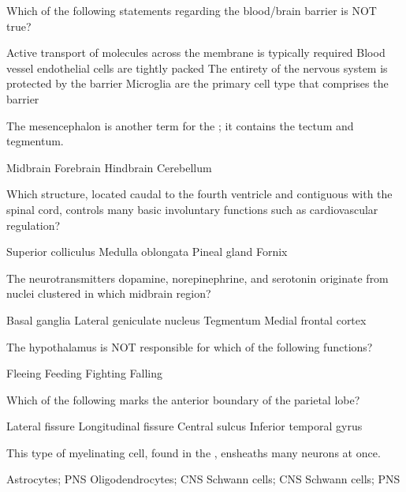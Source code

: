 \documentclass[answers]{exam}
\begin{document}
\begin{questions}
\question Which of the following statements regarding the blood/brain barrier is NOT true?
\begin{choices}
\choice Active transport of molecules across the membrane is typically required 
\choice Blood vessel endothelial cells are tightly packed
\choice The entirety of the nervous system is protected by the barrier 
\correctchoice Microglia are the primary cell type that comprises the barrier
\end{choices}

\question The mesencephalon is another term for the \fillin; it contains the tectum and tegmentum. 
\begin{choices}
\correctchoice Midbrain 
\choice Forebrain
\choice Hindbrain
\choice Cerebellum 
\end{choices}

\question Which structure, located caudal to the fourth ventricle and contiguous with the spinal cord, controls many basic involuntary functions such as cardiovascular regulation?
\begin{choices}
\choice Superior colliculus 
\correctchoice Medulla oblongata 
\choice Pineal gland
\choice Fornix 
\end{choices}

\question The neurotransmitters dopamine, norepinephrine, and serotonin originate from nuclei clustered in which midbrain region? 
\begin{choices}
\choice Basal ganglia
\choice Lateral geniculate nucleus 
\correctchoice Tegmentum 
\choice Medial frontal cortex
\end{choices}

\question The hypothalamus is NOT responsible for which of the following functions?
\begin{choices}
\choice Fleeing 
\choice Feeding 
\choice Fighting 
\correctchoice Falling
\end{choices}

\question Which of the following marks the anterior boundary of the parietal lobe? 
\begin{choices}
\choice Lateral fissure 
\choice Longitudinal fissure 
\correctchoice Central sulcus 
\choice Inferior temporal gyrus 
\end{choices} 

\newpage

\question This type of myelinating cell, found in the \fillin, ensheaths many neurons at once.
\begin{choices}
\choice Astrocytes; PNS 
\correctchoice Oligodendrocytes; CNS 
\choice Schwann cells; CNS 
\choice Schwann cells; PNS  
\end{choices}


\end{questions}
\end{document}
